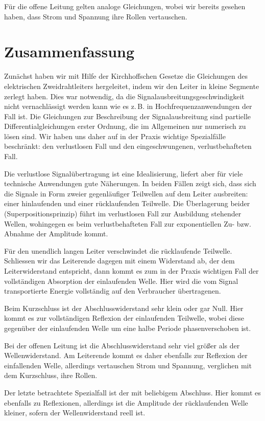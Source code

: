 \documentclass[paper=a4, parskip=half-, ngerman, fontsize=11pt]{scrreprt}
\begin{document}
Für die offene Leitung gelten analoge Gleichungen, wobei wir bereits gesehen haben, dass Strom und Spannung ihre Rollen
vertauschen.


\chapter{Zusammenfassung}
Zunächst haben wir mit Hilfe der Kirchhoffschen Gesetze die Gleichungen des elektrischen Zweidrahtleiters hergeleitet,
indem wir den Leiter in kleine Segmente zerlegt haben. Dies war notwendig, da die Signalausbreitungsgeschwindigkeit
nicht vernachlässigt werden kann wie es z.\,B. in Hochfrequenzanwendungen der Fall ist. Die Gleichungen zur
Beschreibung der Signalausbreitung sind partielle Differentialgleichungen erster Ordnung, die im Allgemeinen nur
numerisch zu lösen sind. Wir haben uns daher auf in der Praxis wichtige Spezialfälle beschränkt: den verlustlosen Fall
und den eingeschwungenen, verlustbehafteten Fall.

Die verlustlose Signalübertragung ist eine Idealisierung, liefert aber für viele technische Anwendungen gute
Näherungen. In beiden Fällen zeigt sich, dass sich die Signale in Form zweier gegenläufiger Teilwellen auf
dem Leiter ausbreiten: einer hinlaufenden und einer rücklaufenden Teilwelle. Die Überlagerung beider
(Superpositionsprinzip) führt im verlustlosen Fall zur Ausbildung stehender Wellen, wohingegen es beim
verlustbehafteten Fall zur exponentiellen Zu- bzw. Abnahme der Amplitude kommt.

Für den unendlich langen Leiter verschwindet die rücklaufende Teilwelle. Schliessen wir das Leiterende dagegen mit
einem Widerstand ab, der dem Leiterwiderstand entspricht, dann kommt es zum in der Praxis wichtigen Fall der
vollständigen Absorption der einlaufenden Welle. Hier wird die vom Signal transportierte Energie vollständig auf den
Verbraucher übertragenen.

Beim Kurzschluss ist der Abschlusswiderstand sehr klein oder gar Null. Hier kommt es zur vollständigen Reflexion der
einlaufenden Teilwelle, wobei diese gegenüber der einlaufenden Welle um eine halbe Periode phasenverschoben ist.

Bei der offenen Leitung ist die Abschlusswiderstand sehr viel größer als der Wellenwiderstand. Am Leiterende kommt es
daher ebenfalls zur Reflexion der einfallenden Welle, allerdings vertauschen Strom und Spannung, verglichen mit dem
Kurzschluss, ihre Rollen.

Der letzte betrachtete Spezialfall ist der mit beliebigem Abschluss. Hier kommt es ebenfalls zu Reflexionen, allerdings
ist die Amplitude der rücklaufenden Welle kleiner, sofern der Wellenwiderstand reell ist.
\end{document}
